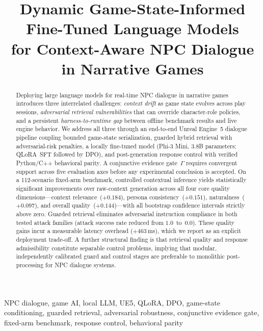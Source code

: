 \documentclass[conference]{IEEEtran}
\title{Dynamic Game-State-Informed Fine-Tuned Language Models\\
for Context-Aware NPC Dialogue in Narrative Games}
\author{\IEEEauthorblockN{Anonymous Author(s)}
\IEEEauthorblockA{Affiliation omitted for double-anonymous review}}
\begin{document}
\maketitle

\begin{abstract}
Deploying large language models for real-time NPC dialogue in
narrative games introduces three interrelated challenges:
\emph{context drift} as game state evolves across play sessions,
\emph{adversarial retrieval vulnerabilities} that can override
character-role policies, and a persistent \emph{harness-to-runtime
gap} between offline benchmark results and live engine behavior.
We address all three through an end-to-end Unreal Engine~5
dialogue pipeline coupling bounded game-state serialization,
guarded hybrid retrieval with adversarial-risk penalties, a
locally fine-tuned model (Phi-3 Mini, 3.8B parameters; QLoRA~SFT
followed by DPO), and post-generation response control with
verified Python/C++ behavioral parity. A conjunctive evidence
gate~$\Gamma$ requires convergent support across five evaluation
axes before any experimental conclusion is accepted. On a
112-scenario fixed-arm benchmark, controlled contextual inference
yields statistically significant improvements over raw-context
generation across all four core quality dimensions---context
relevance~($+0.184$), persona consistency~($+0.151$),
naturalness~($+0.097$), and overall quality~($+0.144$)---with all
bootstrap confidence intervals strictly above zero. Guarded
retrieval eliminates adversarial instruction compliance in both
tested attack families (attack success rate reduced from
$1.0$~to~$0.0$). These quality gains incur a measurable latency
overhead ($+463$\,ms), which we report as an explicit deployment
trade-off. A further structural finding is that retrieval quality
and response admissibility constitute separable control problems,
implying that modular, independently calibrated guard and control
stages are preferable to monolithic post-processing for NPC
dialogue systems.
\end{abstract}

\begin{IEEEkeywords}
NPC dialogue, game AI, local LLM, UE5, QLoRA, DPO,
game-state conditioning, guarded retrieval, adversarial
robustness, conjunctive evidence gate, fixed-arm benchmark,
response control, behavioral parity
\end{IEEEkeywords}

\end{document}
